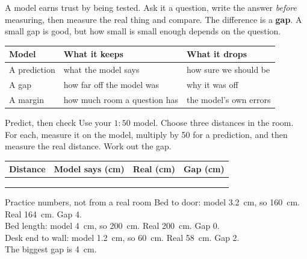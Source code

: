\label{ch5}

A model earns trust by being tested. Ask it a question, write the answer \emph{before} measuring, then measure the real thing and compare. The difference is a \textbf{gap}. A small gap is good, but how small is small enough depends on the question.

\begin{center}
\sffamily\small\renewcommand{\arraystretch}{1.5}
\begin{tabular}{@{}p{3.4cm}p{3.7cm}p{3.7cm}@{}}
\toprule
\textbf{Model} & \textbf{What it keeps} & \textbf{What it drops}\\
\midrule
A prediction & what the model says & how sure we should be\\
A gap & how far off the model was & why it was off\\
A margin & how much room a question has & the model's own errors\\
\bottomrule
\end{tabular}
\end{center}

\begin{tryit}{Predict, then check}
Use your $1:50$ model. Choose three distances in the room. For each, measure it on the model, multiply by 50 for a prediction, and then measure the real distance. Work out the gap.\par\medskip
\renewcommand{\arraystretch}{1.6}
\begin{tabular}{|p{3.4cm}|c|c|c|}
\hline
\textbf{Distance} & \textbf{Model says (cm)} & \textbf{Real (cm)} & \textbf{Gap (cm)}\\ \hline
 & & & \\ \hline
 & & & \\ \hline
 & & & \\ \hline
\end{tabular}
\end{tryit}

\begin{worked}{Practice numbers, not from a real room}
Bed to door: model 3.2~cm, so 160~cm. Real 164~cm. Gap 4.\\
Bed length: model 4~cm, so 200~cm. Real 200~cm. Gap 0.\\
Desk end to wall: model 1.2~cm, so 60~cm. Real 58~cm. Gap 2.\\
The biggest gap is 4~cm.
\end{worked}

\begin{center}
\end{center}

